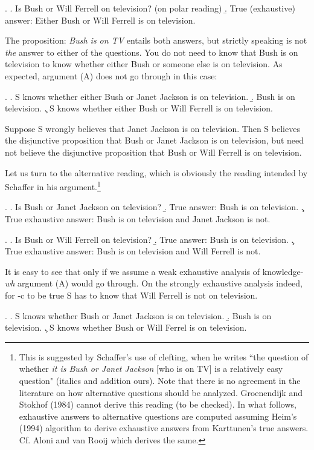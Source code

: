 \ex. \a.  Is   Bush or Will Ferrell on television?  (on polar
reading)
\b. True (exhaustive) answer: Either Bush or Will Ferrell
is on television.



\noindent The proposition: {\it Bush is on TV} entails both
answers, but strictly speaking is  not \emph{the} answer to either
of the questions. You do not need to know that Bush is on
television to know whether either Bush or someone else is on
television. As expected, argument (A) does not go through in this
case:

\ex.  \a. S knows whether  either Bush or Janet Jackson is on
television.
 \b. Bush is on television.
 \c. S knows  whether either Bush or  Will Ferrell is on television.

Suppose S wrongly believes that Janet Jackson is on television.
Then S believes the disjunctive proposition that Bush or Janet
Jackson is on television, but need not believe the disjunctive
proposition that Bush or  Will Ferrell is on television.


Let us turn to the alternative reading, which is obviously the
reading intended by Schaffer in his argument.\footnote{This is
suggested by Schaffer's use of clefting, when he writes ``the
question of whether \emph{it is Bush or Janet Jackson} [who is on
TV] is a relatively easy question" (italics and addition ours).
Note that there is no agreement in the literature on how
alternative questions should be analyzed. Groenendijk and Stokhof
(1984) cannot derive this reading (to be checked). In what
follows, exhaustive answers to alternative questions are computed
assuming Heim's (1994) algorithm to derive exhaustive answers from
Karttunen's true answers. Cf. Aloni and van Rooij which derives
the same.}

\ex. \label{jackson} \a.  Is Bush or Janet Jackson on television?
\b. True answer: Bush is on television. \c. True exhaustive
answer: Bush is on television and Janet Jackson is not.

\ex. \label{ferrell} \a.  Is Bush or Will Ferrell on television?
\b. True answer: Bush is on television. \c. True exhaustive
answer: Bush is on television and Will Ferrell is not.

It is easy to see that only if we assume a weak exhaustive
analysis of knowledge-\emph{wh} argument (A) would go through. On
the strongly exhaustive analysis indeed, for \Next-c to be true S
has to know that Will Ferrell is not on television.

\ex.  \a. S knows whether Bush or Janet Jackson is on television.
 \b. Bush is on television.
 \c. S knows  whether  Bush or  Will Ferrel is on television.

